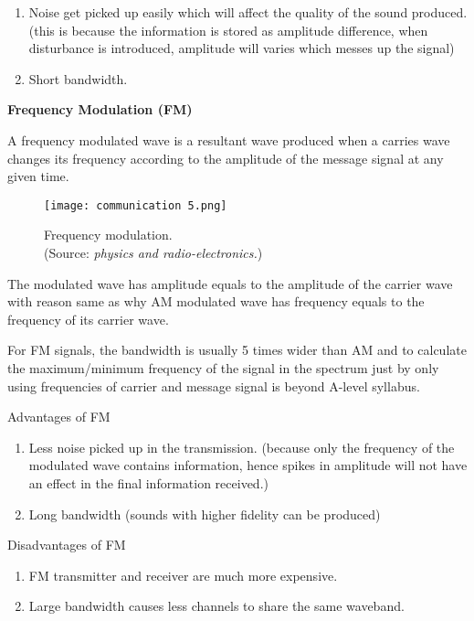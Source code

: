 \documentclass{article}
\begin{document}
\begin{enumerate}
    \item Noise get picked up easily which will affect the quality of the sound produced. (this is because the information is stored as amplitude difference, when disturbance is introduced, amplitude will varies which messes up the signal)
    \item Short bandwidth. 
\end{enumerate}
\begin{flushleft}
\item \textbf{Frequency Modulation (FM)}
\end{flushleft}
A frequency modulated wave is a resultant wave produced when a carries wave changes its frequency according to the amplitude of the message signal at any given time.
\begin{figure}[H]
    \centering
    \captionsetup{justification=centering,margin=2cm}
    \texttt{[image: communication 5.png]}
    \caption*{Frequency modulation. \\ (Source: \textit{physics and radio-electronics.})}
\end{figure}
The modulated wave has amplitude equals to the amplitude of the carrier wave with reason same as why AM modulated wave has frequency equals to the frequency of its carrier wave. 

For FM signals, the bandwidth is usually 5 times wider than AM and to calculate the maximum/minimum frequency of the signal in the spectrum just by only using frequencies of carrier and message signal is beyond A-level syllabus.

\begin{flushleft}
\item Advantages of FM
\end{flushleft}
\begin{enumerate}
    \item Less noise picked up in the transmission. (because only the frequency of the modulated wave contains information, hence spikes in amplitude will not have an effect in the final information received.)
    \item Long bandwidth (sounds with higher fidelity can be produced)
\end{enumerate}
\begin{flushleft}
\item Disadvantages of FM
\end{flushleft}
\begin{enumerate}
    \item FM transmitter and receiver are much more expensive.
    \item Large bandwidth causes less channels to share the same waveband.
\end{enumerate}
\end{document}
